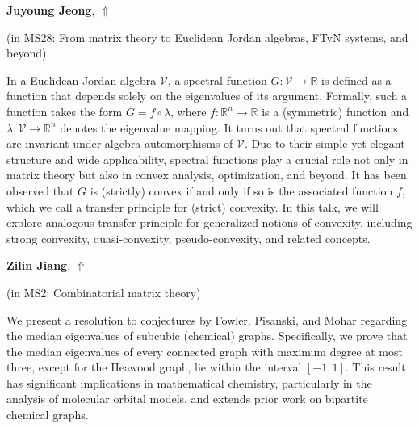 \documentclass[ILAS2025-program.tex]{subfiles}
\begin{document}
\hypertarget{down0383}{}\begin{ilasabstract}
    
\textbf{Juyoung Jeong},  \hfill \hyperlink{up0383}{$\Uparrow$}
    
    
(in {\color{mstitle}MS28: From matrix theory to Euclidean Jordan algebras, FTvN systems, and beyond})
        
\mtskip
    In a Euclidean Jordan algebra $\mathcal{V}$, a spectral function $G : \mathcal{V} \to \mathbb{R}$ is defined as a function that depends solely on the eigenvalues of its argument. Formally, such a function takes the form $G = f \circ \lambda$, where $f : \mathbb{R}^n \to \mathbb{R}$ is a (symmetric) function and $\lambda : \mathcal{V} \to \mathbb{R}^n$ denotes the eigenvalue mapping. It turns out that spectral functions are invariant under algebra automorphisms of $\mathcal{V}$.
Due to their simple yet elegant structure and wide applicability, spectral functions play a crucial role not only in matrix theory but also in convex analysis, optimization, and beyond. It has been observed that $G$ is (strictly) convex if and only if so is the associated function $f$, which we call a transfer principle for (strict) convexity. In this talk, we will explore analogous transfer principle for generalized notions of convexity, including strong convexity, quasi-convexity, pseudo-convexity, and related concepts. 

\end{ilasabstract}
    

\hypertarget{down0033}{}\begin{ilasabstract}
    
\textbf{Zilin Jiang},  \hfill \hyperlink{up0033}{$\Uparrow$}
    
    
(in {\color{mstitle}MS2: Combinatorial matrix theory})
        
\mtskip
    We present a resolution to conjectures by Fowler, Pisanski, and Mohar regarding the median eigenvalues of subcubic (chemical) graphs. Specifically, we prove that the median eigenvalues of every connected graph with maximum degree at most three, except for the Heawood graph, lie within the interval $[-1, 1]$. This result has significant implications in mathematical chemistry, particularly in the analysis of molecular orbital models, and extends prior work on bipartite chemical graphs.

\end{ilasabstract}
    
\end{document}
